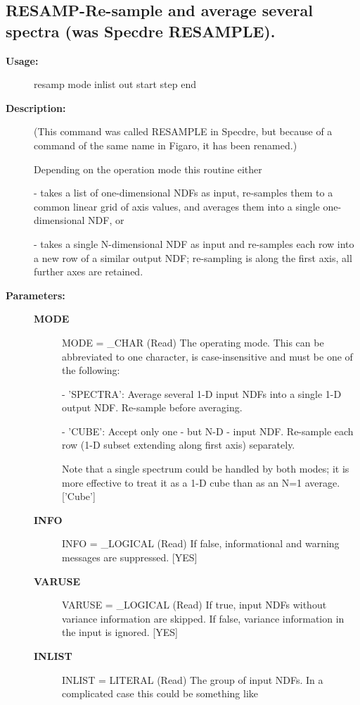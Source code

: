 \subsection{RESAMP-\label{RESAMP}Re-sample and average several spectra (was Specdre RESAMPLE).}
\begin{description}

\item [{\bf Usage:}]

   resamp mode inlist out start step end


\item [{\bf Description:}]

   (This command was called RESAMPLE in Specdre, but because of a
   command of the same name in Figaro, it has been renamed.)

   Depending on the operation mode this routine either

   -  takes a list of one-dimensional NDFs as input, re-samples them
      to a common linear grid of axis values, and averages them into
      a single one-dimensional NDF, or

   -  takes a single N-dimensional NDF as input and re-samples each
      row into a new row of a similar output NDF; re-sampling is
      along the first axis, all further axes are retained.


\item [{\bf Parameters:}]
\begin{description}
\item [{\bf MODE}]
MODE = _CHAR (Read)
   The operating mode. This can be abbreviated to one character,
   is case-insensitive and must be one of the following:

   -  'SPECTRA': Average several 1-D input NDFs into a single
      1-D output NDF. Re-sample before averaging.

   -  'CUBE': Accept only one - but N-D - input NDF. Re-sample each
      row (1-D subset extending along first axis) separately.

   Note that a single spectrum could be handled by both modes; it
   is more effective to treat it as a 1-D cube than as an N=1
   average.
   ['Cube']
\item [{\bf INFO}]
INFO = _LOGICAL (Read)
   If false, informational and warning messages are suppressed.
   [YES]
\item [{\bf VARUSE}]
VARUSE = _LOGICAL (Read)
   If true, input NDFs without variance information are skipped.
   If false, variance information in the input is ignored.
   [YES]
\item [{\bf INLIST}]
INLIST = LITERAL (Read)
   The group of input NDFs. In a complicated case this could be
   something like


\end{description}
\end{description}
